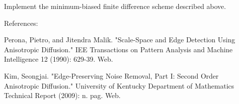 \begin{problem}
Implement the minimum-biased finite difference scheme described above. 
\end{problem}

References:

Perona, Pietro, and Jitendra Malik. "Scale-Space and Edge Detection Using Anisotropic Diffusion." IEE Transactions on Pattern Analysis and Machine Intelligence 12 (1990): 629-39. Web.

Kim, Seongjai. "Edge-Preserving Noise Removal, Part I: Second Order Anisotropic Diffusion." University of Kentucky Department of Mathematics Technical Report (2009): n. pag. Web.